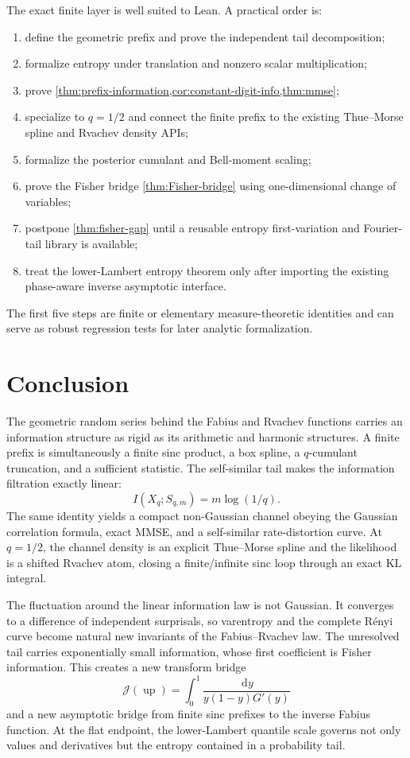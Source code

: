 \documentclass[11pt,oneside]{article}
\theoremstyle{definition}
\theoremstyle{remark}
\newcommand{\Up}{\operatorname{up}}
\newcommand{\dd}{\,\mathrm d}
\begin{document}
The exact finite layer is well suited to Lean.  A practical order is:
\begin{enumerate}
\item define the geometric prefix and prove the independent tail decomposition;
\item formalize entropy under translation and nonzero scalar multiplication;
\item prove \cref{thm:prefix-information,cor:constant-digit-info,thm:mmse};
\item specialize to $q=1/2$ and connect the finite prefix to the existing
      Thue--Morse spline and Rvachev density APIs;
\item formalize the posterior cumulant and Bell-moment scaling;
\item prove the Fisher bridge \cref{thm:Fisher-bridge} using one-dimensional
      change of variables;
\item postpone \cref{thm:fisher-gap} until a reusable entropy first-variation and
      Fourier-tail library is available;
\item treat the lower-Lambert entropy theorem only after importing the existing
      phase-aware inverse asymptotic interface.
\end{enumerate}
The first five steps are finite or elementary measure-theoretic identities and can
serve as robust regression tests for later analytic formalization.

\section{Conclusion}
\label{sec:conclusion}

The geometric random series behind the Fabius and Rvachev functions carries an
information structure as rigid as its arithmetic and harmonic structures.  A
finite prefix is simultaneously a finite sinc product, a box spline, a
$q$-cumulant truncation, and a sufficient statistic.  The self-similar tail makes
the information filtration exactly linear:
\[
 I(X_q;S_{q,m})=m\log(1/q).
\]
The same identity yields a compact non-Gaussian channel obeying the Gaussian
correlation formula, exact MMSE, and a self-similar rate-distortion curve.
At $q=1/2$, the channel density is an explicit Thue--Morse spline and the
likelihood is a shifted Rvachev atom, closing a finite/infinite sinc loop through
an exact KL integral.

The fluctuation around the linear information law is not Gaussian.  It converges
to a difference of independent surprisals, so varentropy and the complete R\'enyi
curve become natural new invariants of the Fabius--Rvachev law.  The unresolved
tail carries exponentially small information, whose first coefficient is Fisher
information.  This creates a new transform bridge
\[
 \mathcal J(\Up)
 =\int_0^1\frac{\dd y}{y(1-y)G'(y)}
\]
and a new asymptotic bridge from finite sinc prefixes to the inverse Fabius
function.  At the flat endpoint, the lower-Lambert quantile scale governs not only
values and derivatives but the entropy contained in a probability tail.
\end{document}
